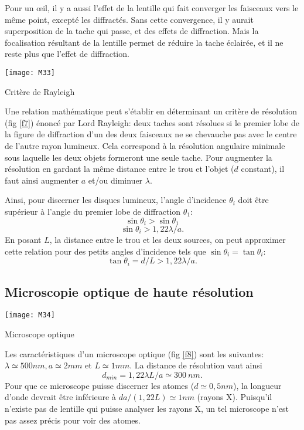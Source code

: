 \noindent Pour un œil, il y a aussi l’effet de la lentille qui fait converger les faisceaux vers le même point, excepté les diffractés. Sans cette convergence, il y aurait superposition de la tache qui passe, et des effets de diffraction. Mais la focalisation résultant de la lentille permet de réduire la tache éclairée, et il ne reste plus que l’effet de diffraction.

\begin{marginfigure}[0cm]
\texttt{[image: M33]}
\caption{Critère de Rayleigh}
\label{f7}
\end{marginfigure}

\noindent Une relation mathématique peut s'établir en déterminant un critère de résolution (fig \ref{f7}) énoncé par Lord Rayleigh: deux taches sont résolues si le premier lobe de la figure de diffraction d'un des deux faisceaux ne se chevauche pas avec le centre de l'autre rayon lumineux. Cela correspond à la résolution angulaire minimale sous laquelle les deux objets formeront une seule tache. Pour augmenter la résolution en gardant la même distance entre le trou et l'objet ($d$ constant), il faut ainsi augmenter $a$ et/ou diminuer $\lambda$.

\noindent Ainsi, pour discerner les disques lumineux, l'angle d'incidence $\theta_i$ doit être supérieur à l'angle du premier lobe de diffraction $\theta_1$:
$$
    \sin\theta_i>\sin\theta_1
$$
$$
    \sin\theta_i>1,22\lambda/a.
$$
En posant $L$, la distance entre le trou et les deux sources, on peut approximer cette relation pour des petits angles d'incidence tels que $\sin\theta_i=\tan \theta_i$:
$$
    \tan\theta_i=d/L>1,22\lambda/a.
$$

\subsection{Microscopie optique de haute résolution}

\begin{marginfigure}[-1.5cm]
\texttt{[image: M34]}
\caption{Microscope optique}
\label{f8}
\end{marginfigure}

Les caractéristiques d'un microscope optique (fig \ref{f8}) sont les suivantes: $\lambda\simeq500nm,a\simeq2mm$ et $L\simeq1mm$. La distance de résolution vaut ainsi 
$$
d_{min}=1,22\lambda L/a\simeq300\:nm.
$$
Pour que ce microscope puisse discerner les atomes ($d\simeq0,5nm$), la longueur d'onde devrait être inférieure à $da/(1,22L)\simeq1nm$ (rayons X). Puisqu'il n'existe pas de lentille qui puisse analyser les rayons X, un tel microscope n'est pas assez précis pour voir des atomes.

